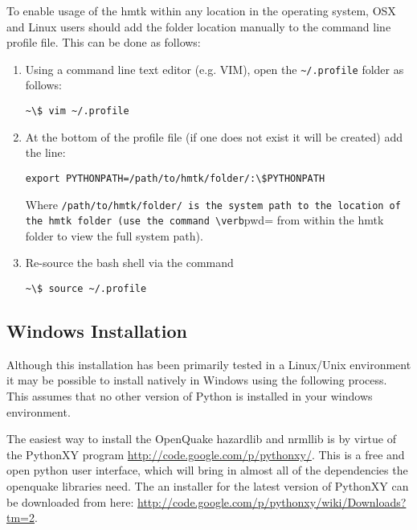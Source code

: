To enable usage of the hmtk within any location in the operating system, OSX and Linux users should add the folder location manually to the command line profile file. This can be done as follows:

\begin{enumerate}
\item Using a command line text editor (e.g. VIM), open the \verb=~/.profile= folder as follows:

\begin{Verbatim}[frame=single, commandchars=\\\{\}, fontsize=\scriptsize]
~\$ vim ~/.profile
\end{Verbatim}

\item At the bottom of the profile file (if one does not exist it will be created) add the line:

\begin{Verbatim}[frame=single, commandchars=\\\{\}, fontsize=\scriptsize]
export PYTHONPATH=/path/to/hmtk/folder/:\$PYTHONPATH
\end{Verbatim}

Where \verb=/path/to/hmtk/folder/ is the system path to the location of the hmtk folder (use the command \verb=pwd= from within the hmtk folder to view the full system path).

\item Re-source the bash shell via the command

\begin{Verbatim}[frame=single, commandchars=\\\{\}, fontsize=\scriptsize]
~\$ source ~/.profile
\end{Verbatim}
 
\end{enumerate}

\subsection{Windows Installation}

Although this installation has been primarily tested in a Linux/Unix environment it may be possible to install natively in Windows using the following process. This assumes that no other version of Python is installed in your windows environment.

The easiest way to install the OpenQuake hazardlib and nrmllib is by virtue of the PythonXY program \href{http://code.google.com/p/pythonxy/}{http://code.google.com/p/pythonxy/}. This is a free and open python user interface, which will bring in almost all of the dependencies the openquake libraries need. The an installer for the latest version of PythonXY can be downloaded from here: \href{http://code.google.com/p/pythonxy/wiki/Downloads?tm=2}{http://code.google.com/p/pythonxy/wiki/Downloads?tm=2}.

